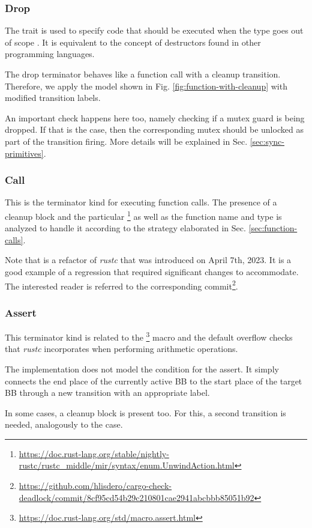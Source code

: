\subsubsection{Drop}

The  trait is used to specify code that should be executed
when the type goes out of scope \cite[Chap. 15.3]{rust-book}.
It is equivalent to the concept of destructors found in other programming languages.

The drop terminator behaves like a function call with a cleanup transition.
Therefore, we apply the model shown in Fig. \ref{fig:function-with-cleanup}
with modified transition labels.

An important check happens here too, namely checking if a mutex guard is being dropped.
If that is the case, then the corresponding mutex should be unlocked
as part of the transition firing.
More details will be explained in Sec. \ref{sec:sync-primitives}.

\subsubsection{Call}

This is the terminator kind for executing function calls.
The presence of a cleanup block and the particular
\footnote{\url{https://doc.rust-lang.org/stable/nightly-rustc/rustc_middle/mir/syntax/enum.UnwindAction.html}}
as well as the function name and type is analyzed to handle it
according to the strategy elaborated in Sec. \ref{sec:function-calls}.

Note that  is a refactor of \emph{rustc}
that was introduced on April 7th, 2023.
It is a good example of a regression that required significant changes to accommodate.
The interested reader is referred to the corresponding
commit\footnote{\url{https://github.com/hlisdero/cargo-check-deadlock/commit/8cf95cd54b29c210801cae2941abcbbb85051b92}}.

\subsubsection{Assert}

This terminator kind is related to the
\footnote{\url{https://doc.rust-lang.org/std/macro.assert.html}}
macro and the default overflow checks that \emph{rustc} incorporates when
performing arithmetic operations.

The implementation does not model the condition for the assert.
It simply connects the end place of the currently active \acrshort{BB}
to the start place of the target \acrshort{BB}
through a new transition with an appropriate label.

In some cases, a cleanup block is present too.
For this, a second transition is needed, analogously to the  case.